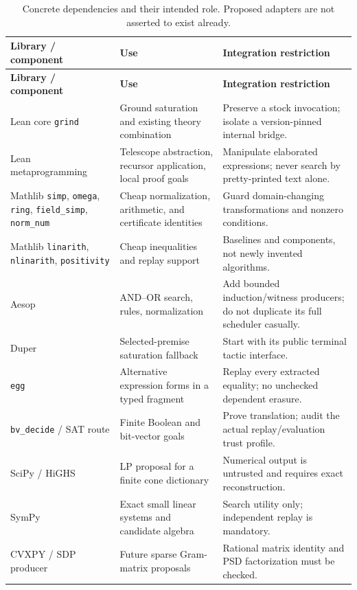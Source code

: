 \documentclass[11pt,a4paper]{article}
\newcommand{\grind}{\texttt{grind}}
\newcommand{\code}[1]{\texttt{#1}}
\begin{document}
\begin{longtable}{@{}>{\raggedright\arraybackslash}p{42mm}>{\raggedright\arraybackslash}p{48mm}>{\raggedright\arraybackslash}p{61mm}@{}}
\caption{Concrete dependencies and their intended role. Proposed adapters are not asserted to exist already.}\\
\toprule
\textbf{Library / component} & \textbf{Use} & \textbf{Integration restriction}\\
\midrule\endfirsthead
\toprule\textbf{Library / component} & \textbf{Use} & \textbf{Integration restriction}\\\midrule\endhead
Lean core \grind{} & Ground saturation and existing theory combination & Preserve a stock invocation; isolate a version-pinned internal bridge.\\
Lean metaprogramming & Telescope abstraction, recursor application, local proof goals & Manipulate elaborated expressions; never search by pretty-printed text alone.\\
Mathlib \code{simp}, \code{omega}, \code{ring}, \code{field\_simp}, \code{norm\_num} & Cheap normalization, arithmetic, and certificate identities & Guard domain-changing transformations and nonzero conditions.\\
Mathlib \code{linarith}, \code{nlinarith}, \code{positivity} & Cheap inequalities and replay support & Baselines and components, not newly invented algorithms.\\
Aesop & AND--OR search, rules, normalization & Add bounded induction/witness producers; do not duplicate its full scheduler casually.\\
Duper & Selected-premise saturation fallback & Start with its public terminal tactic interface.\\
\code{egg} & Alternative expression forms in a typed fragment & Replay every extracted equality; no unchecked dependent erasure.\\
\code{bv\_decide} / SAT route & Finite Boolean and bit-vector goals & Prove translation; audit the actual replay/evaluation trust profile.\\
SciPy / HiGHS & LP proposal for a finite cone dictionary & Numerical output is untrusted and requires exact reconstruction.\\
SymPy & Exact small linear systems and candidate algebra & Search utility only; independent replay is mandatory.\\
CVXPY / SDP producer & Future sparse Gram-matrix proposals & Rational matrix identity and PSD factorization must be checked.\\
\bottomrule
\end{longtable}
\end{document}
